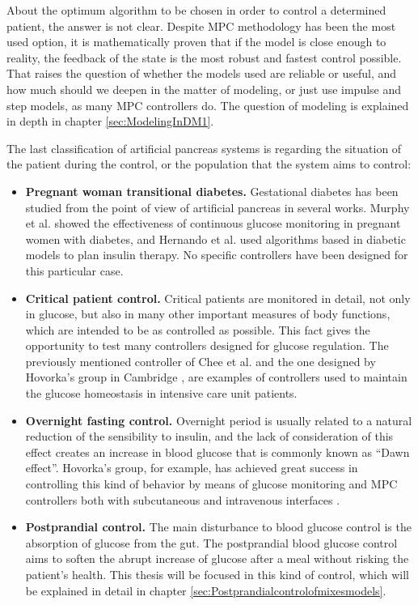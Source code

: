 About the optimum algorithm to be chosen in order to control a determined patient, the answer is not clear. Despite MPC methodology has been the most used option, it is mathematically proven that if the model is close enough to reality, the feedback of the state is the most robust and fastest control possible. That raises the question of whether the models used are reliable or useful, and how much should we deepen in the matter of modeling, or just use impulse and step models, as many MPC controllers do. The question of modeling is explained in depth in chapter \ref{sec:ModelingInDM1}.

The last classification of artificial pancreas systems is regarding the situation of the patient during the control, or the population that the system aims to control:
\begin{itemize}
	\item \textbf{Pregnant woman transitional diabetes.} Gestational diabetes has been studied from the point of view of artificial pancreas in several works. Murphy et al. \cite{murphy2008effectiveness} showed the effectiveness of continuous glucose monitoring in pregnant women with diabetes, and Hernando et al. \cite{hernando1996diabnet} used algorithms based in diabetic models to plan insulin therapy. No specific controllers have been designed for this particular case.
	\item \textbf{Critical patient control.} Critical patients are monitored in detail, not only in glucose, but also in many other important measures of body functions, which are intended to be as controlled as possible. This fact gives the opportunity to test many controllers designed for glucose regulation. The previously mentioned controller of Chee et al. \cite{chee2003expert} and the one designed by Hovorka's group in Cambridge \cite{plank2006multicentric}, are examples of controllers used to maintain the glucose homeostasis in intensive care unit patients.
	\item \textbf{Overnight fasting control.} Overnight period is usually related to a natural reduction of the sensibility to insulin, and the lack of consideration of this effect creates an increase in blood glucose that is commonly known as ``Dawn effect''. Hovorka's group, for example, has achieved great success in controlling this kind of behavior by means of glucose monitoring and MPC controllers both with subcutaneous and intravenous interfaces \cite{schaller2006line}.
	\item \textbf{Postprandial control.} The main disturbance to blood glucose control is the absorption of glucose from the gut. The postprandial blood glucose control aims to soften the abrupt increase of glucose after a meal without risking the patient's health. This thesis will be focused in this kind of control, which will be explained in detail in chapter \ref{sec:Postprandialcontrolofmixesmodels}.
\end{itemize}
